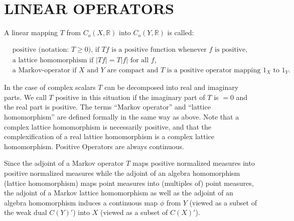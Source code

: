 
\section{LINEAR OPERATORS}
\label{sec:linear-operators}

A linear mapping $T$ from $C_{o}(X,\mathbb{R})$ into $C_{o}(Y,\mathbb{R})$ is called:

\[
\begin{aligned}
	&\text{positive (notation: } T \geq 0 \text{), if } Tf \text{ is a positive function whenever } f \text{ is positive,} \\
	&\text{a lattice homomorphism if } |Tf| = T|f| \text{ for all } f, \\
&\text{a Markov-operator if } X \text{ and } Y \text{ are compact and } T \text{ is a positive operator mapping } 1_{X} \text{ to } 1_{Y}.
\end{aligned}
\]

In the case of complex scalars $T$ can be decomposed into real and imaginary parts.
We call $T$ positive in this situation if the imaginary part of $T$ is $= 0$ and the real part is positive.
The terms \enquote{Markov operator} and \enquote{lattice homomorphism} are defined formally in the same way as above.
Note that a complex lattice homomorphism is necessarily positive, and that the complexification of a real lattice homomorphism is a complex lattice homomorphism.
Positive Operators are always continuous.

Since the adjoint of a Markov operator $T$ maps positive normalized measures into positive normalized measures while the adjoint of an algebra homomorphism (lattice homomorphism) maps point measures into (multiples of) point measures, the adjoint of a Markov lattice homomorphism as well as the adjoint of an algebra homomorphism induces a continuous map $\phi$ from $Y$ (viewed as a subset of the weak dual $C(Y)'$) into $X$ (viewed as a subset of $C(X)'$).

